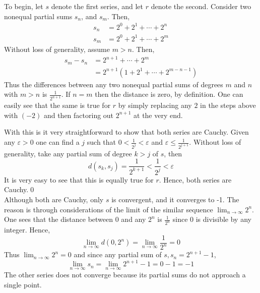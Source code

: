\documentclass[12pt, letterpaper]{article}
\begin{document}
\noindent To begin, let $s$ denote the first series, and let $r$ denote the second. Consider two nonequal partial sums $s_n$, and $s_m$. Then,
\begin{align*}
  s_n &= 2^0 + 2^1 + \cdots + 2^n \\
  s_m &= 2^0 + 2^1 + \cdots + 2^m
\end{align*}
Without loss of generality, assume $m > n$. Then,
\begin{align*}
  s_m - s_n &= 2^{n + 1} + \cdots + 2^m \\
  &= 2^{n + 1}(1 + 2^1 + \cdots + 2^{m - n - 1})
\end{align*}
Thus the differences between any two nonequal partial sums of degrees $m$ and $n$ with $m > n$ is $\frac{1}{2^{n+1}}$. If $n = m$ then the distance is zero, by definition.
One can easily see that the same is true for $r$ by simply replacing any $2$ in the steps above with $(-2)$ and then factoring out $2^{n+1}$ at the very end.
\par With this is it very straightforward to show that both series are
Cauchy. Given any $\varepsilon > 0$ one can find a $j$ such that $0 < \frac{1}{2^j} < \varepsilon$ and $\varepsilon \leq \frac{1}{2^{j + 1}}$.
Without loss of generality, take any partial sum of degree $k > j$ of $s$, then
$$d(s_k, s_j) = \frac{1}{2^{k + 1}} < \frac{1}{2^j} < \varepsilon$$
It is very easy to see that this is equally true for $r$. Hence, both series are Cauchy.\qed\\

\noindent Although both are Cauchy, only $s$ is convergent, and it converges to -1. The reason is through considerations of the limit of the similar sequence $\lim_{n\to\infty} 2^n$.
One sees that the distance between 0 and any $2^n$ is $\frac{1}{2^n}$ since 0 is divisible by any integer. Hence,
$$ \lim_{n\to\infty} d(0, 2^n) = \lim_{n\to\infty} \frac{1}{2^n} = 0$$
Thus $\lim_{n\to\infty} 2^n = 0$ and since any partial sum of $s, s_n = 2^{n+1} - 1$,
$$\lim_{n\to\infty} s_n = \lim_{n\to\infty} 2^{n + 1} - 1 = 0 - 1 = -1$$
The other series does not converge because its partial sums do not approach a single point.
\end{document}
